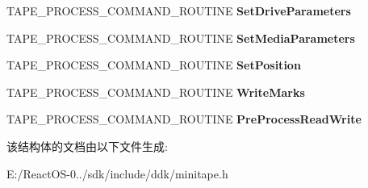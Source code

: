 \begin{DoxyCompactItemize}
T\+A\+P\+E\+\_\+\+P\+R\+O\+C\+E\+S\+S\+\_\+\+C\+O\+M\+M\+A\+N\+D\+\_\+\+R\+O\+U\+T\+I\+NE {\bfseries Set\+Drive\+Parameters}
\item 
\mbox{\label{struct___t_a_p_e___i_n_i_t___d_a_t_a_ab6e21d884466673b6a0a02ee774997bb}} 
T\+A\+P\+E\+\_\+\+P\+R\+O\+C\+E\+S\+S\+\_\+\+C\+O\+M\+M\+A\+N\+D\+\_\+\+R\+O\+U\+T\+I\+NE {\bfseries Set\+Media\+Parameters}
\item 
\mbox{\label{struct___t_a_p_e___i_n_i_t___d_a_t_a_adf20fa3476ad4269ef004e50df0b76b7}} 
T\+A\+P\+E\+\_\+\+P\+R\+O\+C\+E\+S\+S\+\_\+\+C\+O\+M\+M\+A\+N\+D\+\_\+\+R\+O\+U\+T\+I\+NE {\bfseries Set\+Position}
\item 
\mbox{\label{struct___t_a_p_e___i_n_i_t___d_a_t_a_acb672b816efe1a14ea8eb4682435c53d}} 
T\+A\+P\+E\+\_\+\+P\+R\+O\+C\+E\+S\+S\+\_\+\+C\+O\+M\+M\+A\+N\+D\+\_\+\+R\+O\+U\+T\+I\+NE {\bfseries Write\+Marks}
\item 
\mbox{\label{struct___t_a_p_e___i_n_i_t___d_a_t_a_a12db234ba2c98ac993f201695841e0d0}} 
T\+A\+P\+E\+\_\+\+P\+R\+O\+C\+E\+S\+S\+\_\+\+C\+O\+M\+M\+A\+N\+D\+\_\+\+R\+O\+U\+T\+I\+NE {\bfseries Pre\+Process\+Read\+Write}
\end{DoxyCompactItemize}


该结构体的文档由以下文件生成\+:\begin{DoxyCompactItemize}
\item 
E\+:/\+React\+O\+S-\/0../sdk/include/ddk/minitape.\+h\end{DoxyCompactItemize}
